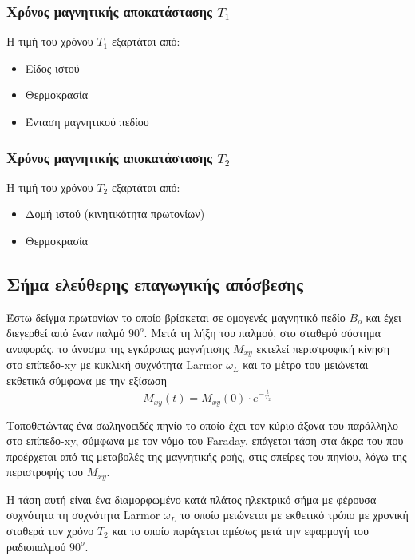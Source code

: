 \documentclass{article}
\begin{document}
\subsubsection{Χρόνος	μαγνητικής	αποκατάστασης	$Τ_1$}
Η	τιμή	του	χρόνου	$Τ_1$	εξαρτάται	από:	
\begin{itemize}
    \item Είδος	ιστού	
    \item Θερμοκρασία
    \item Ένταση	μαγνητικού	πεδίου
\end{itemize}
\subsubsection{Χρόνος	μαγνητικής	αποκατάστασης	$Τ_2$}
Η	τιμή	του	χρόνου	$Τ_2$	εξαρτάται	από:	
\begin{itemize}
    \item Δομή	ιστού	(κινητικότητα	πρωτονίων)	
    \item Θερμοκρασία	
    
\end{itemize}
\clearpage

\subsection{Σήμα	ελεύθερης	επαγωγικής	απόσβεσης}
Έστω	δείγμα	πρωτονίων	 το	οποίο	βρίσκεται	σε	ομογενές	μαγνητικό	πεδίο	$Β_o$	και	έχει	διεγερθεί	από	έναν	παλμό	$90^{o}$.
Μετά	 τη	 λήξη	 του	 παλμού,	 στο	 σταθερό	 σύστημα	 αναφοράς,	 το	 άνυσμα	
της	εγκάρσιας	μαγνήτισης	$M_{xy}$	εκτελεί	περιστροφική	κίνηση	στο	επίπεδο-xy
με	 κυκλική	 συχνότητα	 Larmor	 $ω_L$	 και	 το	 μέτρο	 του	 μειώνεται	 εκθετικά	
σύμφωνα	με	την	εξίσωση	
\begin{equation*}
    M_{xy}(t) =   M_{xy}(0) \cdot e^{-\frac{t}{T_2}}
\end{equation*}
   
    Τοποθετώντας	 ένα	 σωληνοειδές	 πηνίο	 το	 οποίο	 έχει	 τον	 κύριο	 άξονα	 του	
παράλληλο	 στο	 επίπεδο-xy,	 	 σύμφωνα	 με	 τον	 νόμο	 του	 Faraday,	 επάγεται	
τάση	στα	άκρα	 του	που	προέρχεται	από	 τις	μεταβολές	 της	μαγνητικής	 ροής,	
στις	σπείρες	του	πηνίου,	λόγω	της	περιστροφής	του	$M_{xy}$.

Η	 τάση	 αυτή	 είναι	 ένα	 διαμορφωμένο	 κατά	 πλάτος	 ηλεκτρικό	 σήμα	 με	
φέρουσα	συχνότητα	τη	συχνότητα	Larmor	$ω_L$	το	οποίο	μειώνεται	με	εκθετικό	
τρόπο	με	χρονική	σταθερά	τον	χρόνο	$Τ_2$	και	το	οποίο	παράγεται	αμέσως	μετά	
την	εφαρμογή	του	ραδιοπαλμού	$90^{ο}$.	
\end{document}
